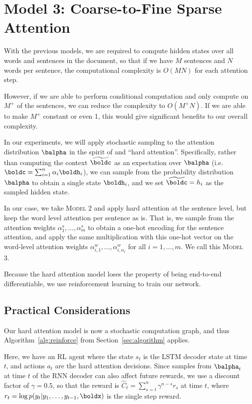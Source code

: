 \documentclass[12pt]{report}
\begin{document}
\section{Model 3: Coarse-to-Fine Sparse Attention}

With the previous models, we are required to compute hidden states over all words and sentences in the document, so that if we have $M$ sentences and $N$ words per sentence, the computational complexity is $O(MN)$ for each attention step.

However, if we are able to perform conditional computation and only compute on $M^+$ of the sentences, we can reduce the complexity to $O(M^+N)$. If we are able to make $M^+$ constant or even 1, this would give significant benefits to our overall complexity.

In our experiments, we will apply stochastic sampling to the attention distribution $\balpha$ in the spirit of \citet{xu2015captioning} and ``hard attention''.
Specifically, rather than computing the context $\widetilde{\boldc}$ as an expectation over $\balpha$ (i.e. $\boldc = \sum_{i=1}^n \alpha_i \boldh_i$), we can sample from the probability distribution $\balpha$ to obtain a single state $\boldh_i$, and we set $\widetilde{\boldc} = h_i$ as the sampled hidden state.

In our case, we take \textsc{Model 2} and apply hard attention at the sentence level, but keep the word level attention per sentence as is. That is, we sample from the attention weights $\alpha_1^s, \ldots, \alpha_m^s$ to obtain a one-hot encoding for the sentence attention, and apply the same multiplication with this one-hot vector on the word-level attention weights $\alpha_{i,1}^w, \ldots, \alpha_{i,n_i}^w$ for all $i = 1, \ldots, m$. We call this \textsc{Model 3}.


Because the hard attention model loses the property of being end-to-end differentiable, we use reinforcement learning to train our network.


\subsection{Practical Considerations}
\label{sec:practical}

Our hard attention model is now a stochastic computation graph, and thus Algorithm~\ref{alg:reinforce} from Section~\ref{sec:algorithm} applies.

Here, we have an RL agent where the state $s_t$ is the LSTM decoder state at time $t$, and actions $a_t$ are the hard attention decisions.
Since samples from $\balpha_t$ at time $t$ of the RNN decoder can also affect future rewards, we use a discount factor of $\gamma = 0.5$, so that the reward is $\hat{C}_t = \sum_{s = t}^n \gamma^{n-s}r_s$ at time $t$, where $r_t = \log p(y_t | y_1, \ldots, y_{t-1}, \boldx)$ is the single step reward.
\end{document}
